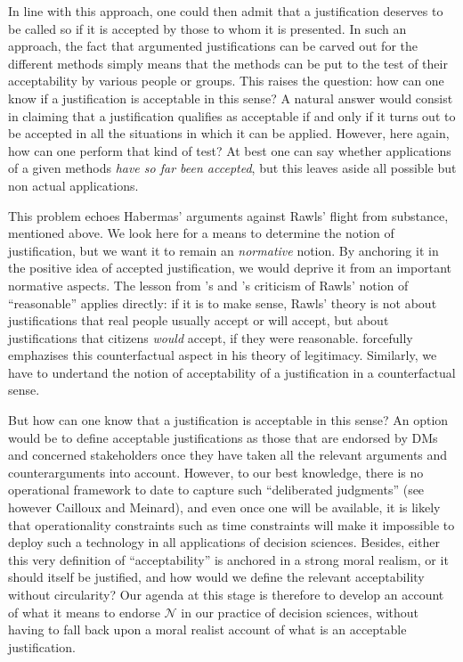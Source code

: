 \documentclass[preprint, french, english, 11pt, authoryear]{elsarticle}%
\newcommand{\adv}{\mathscr{N}}
\begin{document}
In line with this approach, one could then admit that a justification deserves to be called so if it is accepted by those to whom it is presented. In such an approach, the fact that argumented justifications can be carved out for the different methods simply means that the methods can be put to the test of their acceptability by various people or groups. This raises the question: how can one know if a justification is acceptable in this sense? A natural answer would consist in claiming that a justification qualifies as acceptable if and only if it turns out to be accepted in all the situations in which it can be applied. However, here again, how can one perform that kind of test? At best one can say whether applications of a given methods \emph{have so far been accepted}, but this leaves aside all possible but non actual applications.

This problem echoes Habermas' arguments against Rawls' flight from substance, mentioned above. We look here for a means to determine the notion of justification, but we want it to remain an \emph{normative} notion. By anchoring it in the positive idea of accepted justification, we would deprive it from an important normative aspects. The lesson from \cite{habermas_reconciliation_1995}'s and \cite{estlund_democratic_2009}'s criticism of Rawls' notion of ``reasonable'' applies directly: if it is to make sense, Rawls' theory is not about justifications that real people usually accept or will accept, but about justifications that citizens \emph{would} accept, if they were reasonable. \cite{habermas_faktizitat_1992} forcefully emphazises this counterfactual aspect in his theory of legitimacy. Similarly, we have to undertand the notion of acceptability of a justification in a counterfactual sense. 

But how can one know that a justification is acceptable in this sense? An option would be to define acceptable justifications as those that are endorsed by \acp{DM} and concerned stakeholders once they have taken all the relevant arguments and counterarguments into account. However, to our best knowledge, there is no operational framework to date to capture such ``deliberated judgments'' (see however Cailloux and Meinard), and even once one will be available, it is likely that operationality constraints such as time constraints will make it impossible to deploy such a technology in all applications of decision sciences. Besides, either this very definition of ``acceptability'' is anchored in a strong moral realism, or it should itself be justified, and how would we define the relevant acceptability without circularity? Our agenda at this stage is therefore to develop an account of what it means to endorse $\adv$ in our practice of decision sciences, without having to fall back upon a moral realist account of what is an acceptable justification.
\end{document}
